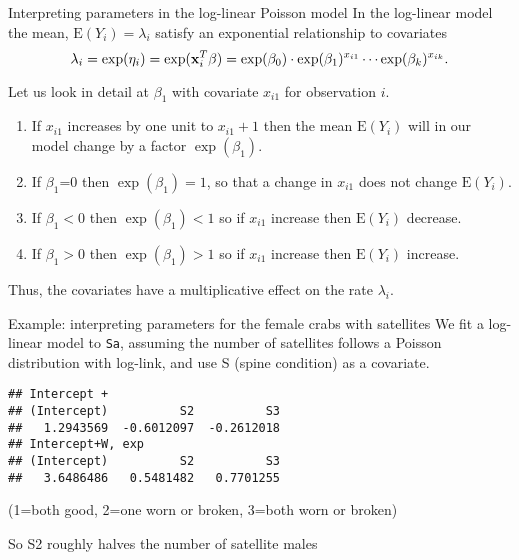 \documentclass[
  ignorenonframetext,
]{beamer}
\providecommand{\tightlist}{%
  \setlength{\itemsep}{0pt}\setlength{\parskip}{0pt}}
\begin{document}
\begin{frame}
\begin{block}{Interpreting parameters in the log-linear Poisson model}
\label{interpreting-parameters-in-the-log-linear-poisson-model}
In the log-linear model the mean, \(\text{E}(Y_i)=\lambda_i\) satisfy an
exponential relationship to covariates
\[ \lambda_i=\exp(\eta_i)=\exp({\bf x}_i^T \beta)=\exp(\beta_0)\cdot \exp(\beta_1)^{x_{i1}}
\cdots \exp(\beta_k)^{x_{ik}}.\]

Let us look in detail at \(\beta_1\) with covariate \(x_{i1}\) for
observation \(i\).

\begin{enumerate}
\tightlist
\item
  If \(x_{i1}\) increases by one unit to \(x_{i1}+1\) then the mean
  \(\text{E}(Y_i)\) will in our model change by a factor
  \(\exp(\beta_1)\).
\item
  If \(\beta_1\)=0 then \(\exp(\beta_1)=1\), so that a change in
  \(x_{i1}\) does not change \(\text{E}(Y_i)\).
\item
  If \(\beta_1<0\) then \(\exp(\beta_1)<1\) so if \(x_{i1}\) increase
  then \(\text{E}(Y_i)\) decrease.
\item
  If \(\beta_1>0\) then \(\exp(\beta_1)>1\) so if \(x_{i1}\) increase
  then \(\text{E}(Y_i)\) increase.
\end{enumerate}

Thus, the covariates have a multiplicative effect on the rate
\(\lambda_i\).
\end{block}
\end{frame}

\begin{frame}[fragile]
\begin{block}{Example: interpreting parameters for the female crabs with
satellites}
\label{example-interpreting-parameters-for-the-female-crabs-with-satellites}
We fit a log-linear model to \texttt{Sa}, assuming the number of
satellites follows a Poisson distribution with log-link, and use S
(spine condition) as a covariate.

\begin{verbatim}
## Intercept + 
## (Intercept)          S2          S3 
##   1.2943569  -0.6012097  -0.2612018 
## Intercept+W, exp
## (Intercept)          S2          S3 
##   3.6486486   0.5481482   0.7701255
\end{verbatim}

(1=both good, 2=one worn or broken, 3=both worn or broken)

So S2 roughly halves the number of satellite males
\end{block}
\end{frame}
\end{document}
